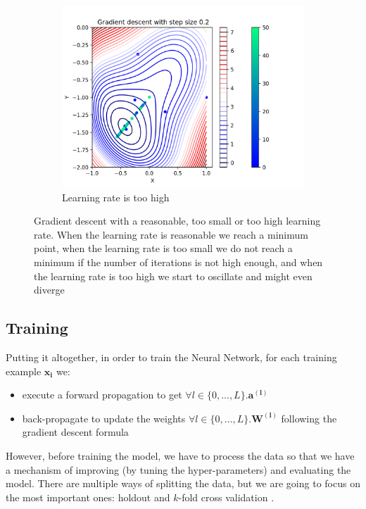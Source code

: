 \begin{figure}[]
\begin{subfigure}[b]{0.32\linewidth}
    \includegraphics[width=\linewidth]{images/gradient_descent_too_high.png}
     \caption{Learning rate is too high}
  \end{subfigure}
  \caption{Gradient descent with a reasonable, too small or too high learning rate. When the learning rate is reasonable we reach a minimum point, when the learning rate is too small we do not reach a minimum if the number of iterations is not high enough, and when the learning rate is too high we start to oscillate and might even diverge}
  \label{fig:learning_rate}
\end{figure}
\subsection{Training}
Putting it altogether, in order to train the Neural Network, for each training example $\boldsymbol{x_i}$ we:
\begin{itemize}
    \item execute a forward propagation to get $\forall l \in \{0, ..., L\}.\boldsymbol{a^{(l)}}$
    
    \item back-propagate to update the weights $\forall l \in \{0, ..., L\}.\boldsymbol{W^{(l)}}$ following the gradient descent formula
\end{itemize}

However, before training the model, we have to process the data so that we have a mechanism of improving (by tuning the hyper-parameters) and evaluating the model. There are multiple ways of splitting the data, but we are going to focus on the most important ones: holdout and $k$-fold cross validation \cite{ml, russell2016artificial, Goodfellow-et-al-2016}.

